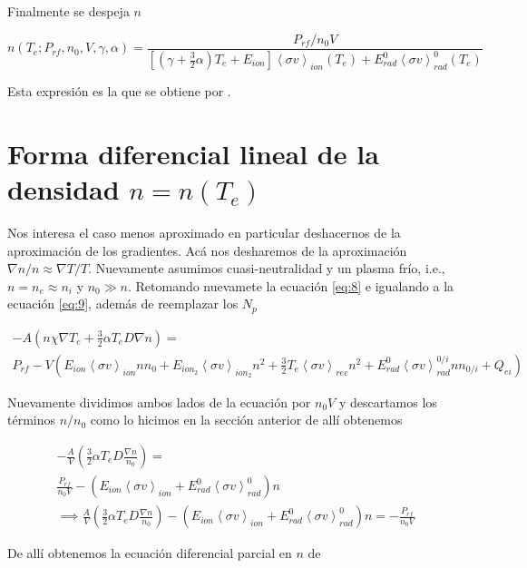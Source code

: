 \documentclass[11pt]{article}
\theoremstyle{definition}
\begin{document}
  Finalmente se despeja $n$

  \begin{equation}
    n(T_e; P_{rf}, n_0, V, \gamma, \alpha) = \frac{P_{rf}/n_0V}{\left[ \left(\gamma + \frac{3}{2}\alpha\right)T_e + E_{ion}\right] \left<\sigma v\right>_{ion}(T_e) + E_{rad}^0\left<\sigma v\right>_{rad}^0(T_e)}
  \end{equation}

  Esta expresi\'on es la que se obtiene por \cite{lechte2002}.

  \section{Forma diferencial lineal de la densidad $n = n(T_e)$}
  Nos interesa el caso menos aproximado en particular deshacernos de la aproximaci\'on de los gradientes. Ac\'a nos desharemos de la aproximaci\'on $\nabla n /n \approx \nabla T /T$. Nuevamente asumimos cuasi-neutralidad y un plasma fr\'io, i.e., $n = n_e \approx n_i$ y $n_0 \gg n$. Retomando nuevamete la ecuaci\'on \eqref{eq:8} e igualando a la ecuaci\'on \eqref{eq:9}, adem\'as de reemplazar los $N_p$

  \begin{eqnarray*}
    -A\left(n\chi\nabla T_e + \frac{3}{2}\alpha T_e D\nabla n\right) = \\ P_{rf} - V\left(E_{ion}\left<\sigma v\right>_{ion}nn_0 + E_{ion_2}\left<\sigma v\right>_{ion_2}n^2 + \frac{3}{2}T_e\left<\sigma v\right>_{rec}n^2 + E_{rad}^0\left<\sigma v\right>_{rad}^{0/i}n n_{0/i} + Q_{ei}\right) 
  \end{eqnarray*}

  Nuevamente dividimos ambos lados de la ecuaci\'on por $n_0 V$ y descartamos los t\'erminos $n/n_0$ como lo hicimos en la secci\'on anterior de all\'i obtenemos

  \begin{eqnarray*}
    -\frac{A}{V}\left(\frac{3}{2}\alpha T_e D\frac{\nabla n}{n_0}\right) = \\ \frac{P_{rf}}{n_0V} - \left(E_{ion}\left<\sigma v\right>_{ion} + E_{rad}^0\left<\sigma v\right>_{rad}^{0}\right)n \\
    \implies \frac{A}{V}\left(\frac{3}{2}\alpha T_e D\frac{\nabla n}{n_0}\right) - \left(E_{ion}\left<\sigma v\right>_{ion} + E_{rad}^0\left<\sigma v\right>_{rad}^{0  }\right)n = -\frac{P_{rf}}{n_0V}
    \end{eqnarray*}
 
    De all\'i obtenemos la ecuaci\'on diferencial parcial en $n$ de 
\end{document}
